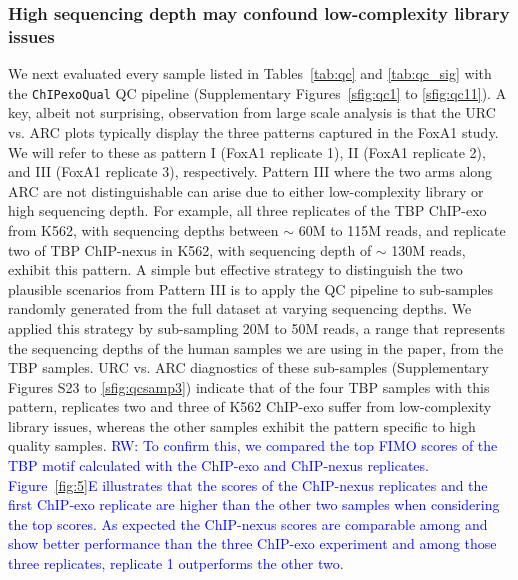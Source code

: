 \documentclass{bmcart}
\newcommand{\pname}[1]{\texttt{ChIPexoQual}}
\newcommand{\SK}[1]{\textcolor{red}{SK: #1}}
\newcommand{\RW}[1]{\textcolor{blue}{RW: #1}}
\begin{document}

\subsubsection*{High sequencing depth may confound low-complexity
  library issues}
We next evaluated every sample listed in Tables~\ref{tab:qc} and
\ref{tab:qc_sig} with the \pname{} QC pipeline (Supplementary
Figures~\ref{sfig:qc1} to \ref{sfig:qc11}). A key, albeit not
surprising, observation from large scale analysis is that the URC
vs. ARC plots typically display the three patterns captured in the
FoxA1 study. We will refer to these as pattern I (FoxA1 replicate 1),
II (FoxA1 replicate 2), and III (FoxA1 replicate 3), respectively.
Pattern III where the two arms along ARC are not distinguishable can
arise due to either low-complexity library or high sequencing depth.
For example, all three replicates of the TBP ChIP-exo from K562, with
sequencing depths between $\sim$ 60M to 115M reads, and replicate two
of TBP ChIP-nexus in K562, with sequencing depth of $\sim$ 130M reads,
exhibit this pattern. A simple but effective strategy to distinguish
the two plausible scenarios from Pattern III is to apply the QC
pipeline to sub-samples randomly generated from the full dataset at
varying sequencing depths. We applied this strategy by sub-sampling
20M to 50M reads, a range that represents the sequencing depths of the
human samples we are using in the paper, from the TBP samples.  URC
vs. ARC diagnostics of these sub-samples (Supplementary Figures S23 to
\ref{sfig:qcsamp3}) indicate that of the four TBP samples with this
pattern, replicates two and three of K562 ChIP-exo suffer from
low-complexity library issues, whereas the other samples exhibit the
pattern specific to high quality samples. \RW{To confirm this, we
  compared the top FIMO scores \cite{fimo} of the TBP motif calculated
  with the ChIP-exo and ChIP-nexus replicates. Figure~\ref{fig:5}E
  illustrates that the scores of the ChIP-nexus replicates and the
  first ChIP-exo replicate are higher than the other two samples when
  considering the top scores. As expected the ChIP-nexus scores are
  comparable among and show better performance than the three ChIP-exo
  experiment and among those three replicates, replicate 1 outperforms
  the other two.}
\end{document}
